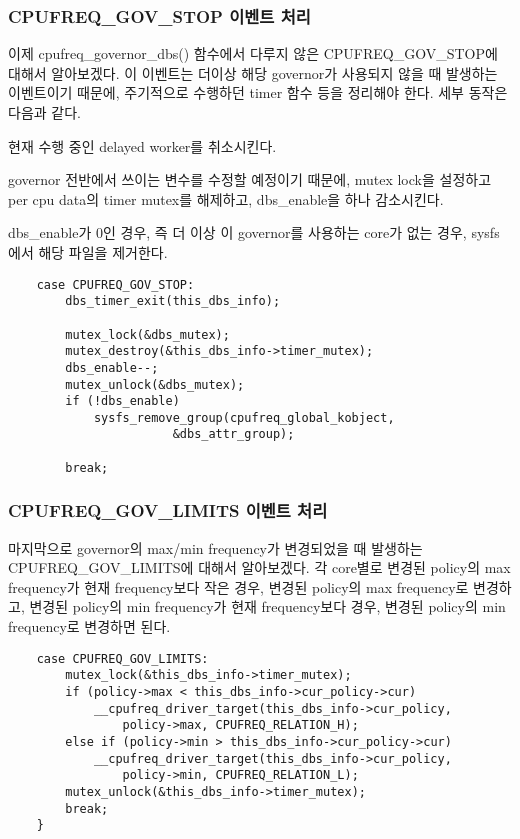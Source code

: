 \subsubsection{CPUFREQ\_GOV\_STOP 이벤트 처리}
이제 cpufreq\_governor\_dbs() 함수에서 다루지 않은 CPUFREQ\_GOV\_STOP에 대해서 알아보겠다. 
이 이벤트는 더이상 해당 governor가 사용되지 않을 때 발생하는 이벤트이기 때문에, 주기적으로 수행하던 timer 함수 등을 정리해야 한다. 
세부 동작은 다음과 같다. 
\begin{compactenum}
\item 현재 수행 중인 delayed worker를 취소시킨다. 
\item governor 전반에서 쓰이는 변수를 수정할 예정이기 때문에, mutex lock을 설정하고 per cpu data의 timer mutex를 해제하고, dbs\_enable을 하나 감소시킨다. 
\item dbs\_enable가 0인 경우, 즉 더 이상 이 governor를 사용하는 core가 없는 경우, sysfs에서 해당 파일을 제거한다.
\end{compactenum}

\begin{lstlisting}
    case CPUFREQ_GOV_STOP:
        dbs_timer_exit(this_dbs_info);

        mutex_lock(&dbs_mutex);
        mutex_destroy(&this_dbs_info->timer_mutex);
        dbs_enable--;
        mutex_unlock(&dbs_mutex);
        if (!dbs_enable)
            sysfs_remove_group(cpufreq_global_kobject,
                       &dbs_attr_group);

        break;
\end{lstlisting}


\subsubsection{CPUFREQ\_GOV\_LIMITS 이벤트 처리}
마지막으로 governor의 max/min frequency가 변경되었을 때 발생하는 CPUFREQ\_GOV\_LIMITS에 대해서 알아보겠다. 
각 core별로 변경된 policy의 max frequency가 현재 frequency보다 작은 경우, 
변경된 policy의 max frequency로 변경하고, 변경된 policy의 min frequency가 현재 frequency보다  경우, 
변경된 policy의 min frequency로 변경하면 된다. 
\begin{lstlisting}
    case CPUFREQ_GOV_LIMITS:
        mutex_lock(&this_dbs_info->timer_mutex);
        if (policy->max < this_dbs_info->cur_policy->cur)
            __cpufreq_driver_target(this_dbs_info->cur_policy,
                policy->max, CPUFREQ_RELATION_H);
        else if (policy->min > this_dbs_info->cur_policy->cur)
            __cpufreq_driver_target(this_dbs_info->cur_policy,
                policy->min, CPUFREQ_RELATION_L);
        mutex_unlock(&this_dbs_info->timer_mutex);
        break;
    }
\end{lstlisting}
